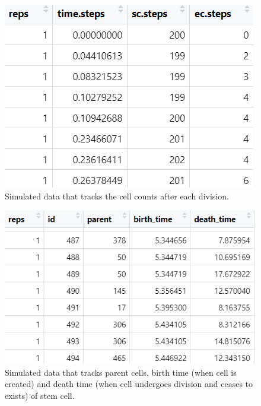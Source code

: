 \documentclass[11pt]{article}
\begin{document}
\begin{figure}
    \centering
    \includegraphics[width=0.5\linewidth]{trackingdivision.png}
    \caption{Simulated data that tracks the cell counts after each division.}
    \label{fig:division}
\end{figure}

\begin{figure}
    \centering
    \includegraphics[width=0.5\linewidth]{trackingtime.png}
    \caption{Simulated data that tracks parent cells, birth time (when cell is created) and death time (when cell undergoes division and ceases to exists) of stem cell.}
    \label{fig:time}
\end{figure}
\newpage
\end{document}
